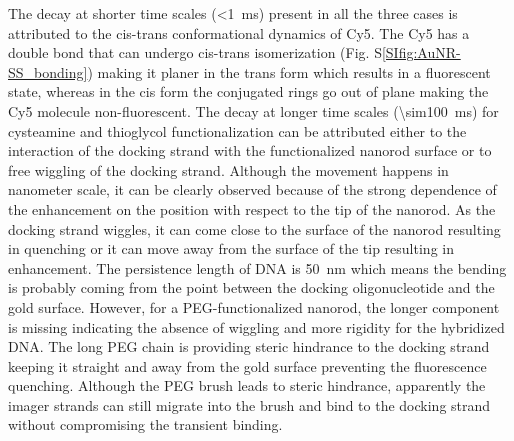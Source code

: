 The decay at shorter time scales (\SI{<1}{\ms}) present in all the three cases is attributed to the cis-trans conformational dynamics of Cy5.\cite{yeh2008tunable}
The Cy5 has a double bond that can undergo cis-trans isomerization (Fig. S\ref{SIfig:AuNR-SS_bonding}) making it planer in the trans form which results in a fluorescent state, whereas in the cis form the conjugated rings go out of plane making the Cy5 molecule non-fluorescent.
The decay at longer time scales (\SI{\sim100}{\ms}) for cysteamine and thioglycol functionalization can be attributed either to the interaction of the docking strand with the functionalized nanorod surface or to free wiggling of the docking strand.
Although the movement happens in nanometer scale, it can be clearly observed because of the strong dependence of the enhancement on the position with respect to the tip of the nanorod.
As the docking strand wiggles, it can come close to the surface of the nanorod resulting in quenching or it can move away from the surface of the tip resulting in enhancement.
The persistence length of DNA\cite{manning2006the} is \SI{50}{\nm} which means the bending is probably coming from the point between the docking oligonucleotide and the gold surface.
However, for a PEG-functionalized nanorod, the longer component is missing indicating the absence of wiggling and more rigidity for the hybridized DNA.
The long PEG chain is providing steric hindrance to the docking strand keeping it straight and away from the gold surface preventing the fluorescence quenching.
Although the PEG brush leads to steric hindrance, apparently the imager strands can still migrate into the brush and bind to the docking strand without compromising the transient binding.


